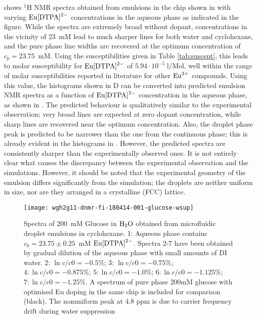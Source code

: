  shows $^1$H NMR spectra obtained from emulsions in the chip
shown in  with varying $\ce{Eu[DTPA]^{2-}}$ concentrations in the aqueous
phase as indicated in the figure. While the spectra are extremely broad without dopant,
concentrations in the vicinity of 23~mM lead to much sharper lines for both water and cyclohexane,
and the pure phase line widths are recovered at the optimum concentration of $c_p=23.75$~mM.
Using the susceptibilities given in
Table \ref{tab:suscept}, this leads to molar susceptibility for $\ce{Eu[DTPA]^{2-}}$
of $5.94\cdot 10^{-5}\;\mathrm{l/\text{Mol}}$, well within the range
 of molar susceptibilities reported in literature for other $\ce{Eu^{3+}}$
 compounds. Using this value, the histograms
shown in D can be converted into
predicted emulsion NMR spectra as a function of $\ce{Eu[DTPA]^{2-}}$
concentration in the aqueous phase,
as shown in .
The predicted behaviour is qualitatively similar to the experimental observation; very broad
lines are expected at zero dopant concentration, while sharp lines are recovered near the optimum
concentration. Also, the droplet phase peak is predicted to be narrower than the one from the continuous phase; this is already evident
in the histograms in .  However, the predicted spectra are consistently sharper than the experimentally
observed ones.
It is not entirely clear what causes the discrepancy between the experimental observation
and the simulations. However, it should be noted that the experimental geometry of the emulsion
differs significantly from the simulation; the droplets are neither uniform in size, nor are they
arranged in a crystalline (FCC) lattice.


\begin{figure}
\begin{center}
	\texttt{[image: wgh2g11-dnmr-fi-180414-001-glucose-wsup]}
\end{center}
\caption{Spectra of 200~mM Glucose in $\ce{H_2O}$ obtained from microfluidic droplet emulsions in
	cyclohexane. 1: Aqueous phase contains $c_0=23.75\pm0.25$~mM $\ce{Eu[DTPA]^{2-}}$. Spectra 2-7
	have been obtained by gradual dilution of the aqueous phase with small amounts of DI water.
	2: $\ln c/c0 = -0.5\%$; 3: $\ln c/c0 = -0.75\%$; $4: \ln c/c0 = -0.875\%$;
	$5: \ln c/c0 = -1.0\%$; $6: \ln c/c0 = -1.125\%$; $7: \ln c/c0 = -1.25\%$. A spectrum of pure phase 200mM glucose
	with optimised Eu doping in the same chip is included for comparison (black). The nonuniform peak at 4.8 ppm is due to carrier frequency drift during water suppression }
\label{fig:glucose-dilution}
\end{figure}


